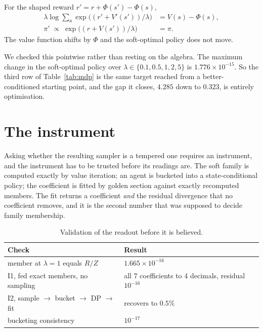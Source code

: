 \documentclass[11pt]{article}
\theoremstyle{remark}
\begin{document}
For the shaped reward $r' = r + \Phi(s') - \Phi(s)$,
\begin{align}
  \lambda \log \sum_a \exp\!\big((r' + V'(s'))/\lambda\big) &= V(s) - \Phi(s),
  \label{eq:shape-value}\\
  \pi' \;\propto\; \exp\!\big((r + V(s'))/\lambda\big) &= \pi .
  \label{eq:shape-policy}
\end{align}
The value function shifts by $\Phi$ and the soft-optimal policy does not move.

We checked this pointwise rather than resting on the algebra. The maximum change
in the soft-optimal policy over $\lambda \in \{0.1, 0.5, 1, 2, 5\}$ is
$1.776\times 10^{-15}$. So the third row of Table~\ref{tab:mdp} is the same
target reached from a better-conditioned starting point, and the gap it closes,
$4.285$ down to $0.323$, is entirely optimisation.

\section{The instrument}\label{sec:instrument}

Asking whether the resulting sampler is a tempered one requires an instrument,
and the instrument has to be trusted before its readings are. The soft family is
computed exactly by value iteration; an agent is bucketed into a
state-conditional policy; the coefficient is fitted by golden section against
exactly recomputed members. The fit returns a coefficient \emph{and} the residual
divergence that no coefficient removes, and it is the second number that was
supposed to decide family membership.

\begin{table}[t]
\centering
\begin{tabular}{ll}
\toprule
Check & Result \\
\midrule
member at $\lambda = 1$ equals $R/Z$ & $1.665\times 10^{-16}$ \\
I1, fed exact members, no sampling & all $7$ coefficients to $4$ decimals, residual $10^{-16}$ \\
I2, sample $\to$ bucket $\to$ DP $\to$ fit & recovers to $0.5\%$ \\
bucketing consistency & $10^{-17}$ \\
\bottomrule
\end{tabular}
\caption{Validation of the readout before it is believed.}
\label{tab:instrument}
\end{table}
\end{document}
